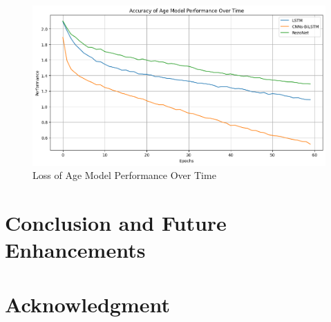 \documentclass[conference, 10pt,onecolumn]{IEEEtran}
\begin{document}
\begin{figure}
    \centering
    \includegraphics[width=4 in]{Loss_Age_valid.png}
    \caption{Loss of Age Model Performance Over Time}
    \label{fig:Loss_Age_valid}
\end{figure}
\section{Conclusion and Future Enhancements}
\section{Acknowledgment}

\end{document}
